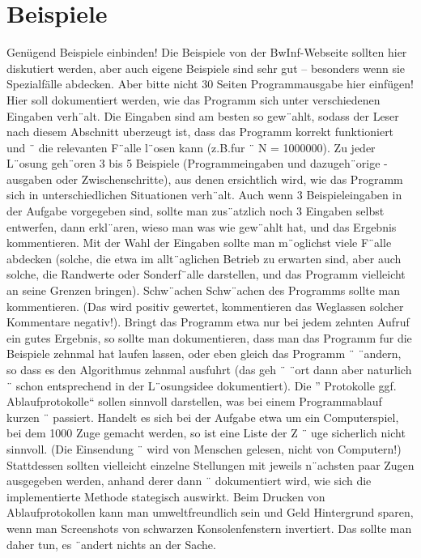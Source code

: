 \documentclass[a4paper,10pt,ngerman]{scrartcl}
\begin{document}
    \section{Beispiele}\label{sec:beispiele}
    Genügend Beispiele einbinden!
    Die Beispiele von der BwInf-Webseite sollten hier diskutiert werden,
    aber auch eigene Beispiele sind sehr gut – besonders wenn sie Spezialfälle abdecken.
    Aber bitte nicht 30 Seiten Programmausgabe hier einfügen!
    Hier soll dokumentiert werden, wie das Programm sich unter verschiedenen Eingaben verh¨alt.
    Die Eingaben sind am besten so gew¨ahlt, sodass der Leser
    nach diesem Abschnitt uberzeugt ist, dass das Programm korrekt funktioniert und ¨
    die relevanten F¨alle l¨osen kann (z.B.fur ¨ N = 1000000).
    Zu jeder L¨osung geh¨oren 3 bis 5 Beispiele (Programmeingaben und dazugeh¨orige -
    ausgaben oder Zwischenschritte), aus denen ersichtlich wird, wie das Programm sich
    in unterschiedlichen Situationen verh¨alt.
    Auch wenn 3 Beispieleingaben in der Aufgabe
    vorgegeben sind, sollte man zus¨atzlich noch 3 Eingaben selbst entwerfen, dann erkl¨aren,
    wieso man was wie gew¨ahlt hat, und das Ergebnis kommentieren.
    Mit der Wahl der Eingaben sollte man m¨oglichst viele F¨alle abdecken (solche, die etwa im allt¨aglichen Betrieb
    zu erwarten sind, aber auch solche, die Randwerte oder Sonderf¨alle darstellen, und das
    Programm vielleicht an seine Grenzen bringen).
    Schw¨achen Schw¨achen des Programms sollte man kommentieren. (Das wird positiv gewertet,
    kommentieren das Weglassen solcher Kommentare negativ!).
    Bringt das Programm etwa nur bei jedem zehnten Aufruf ein gutes Ergebnis, so sollte man dokumentieren, dass man das
    Programm fur die Beispiele zehnmal hat laufen lassen, oder eben gleich das Programm ¨
    ¨andern, so dass es den Algorithmus zehnmal ausfuhrt (das geh ¨ ¨ort dann aber naturlich ¨
    schon entsprechend in der L¨osungsidee dokumentiert).
    Die ” Protokolle ggf.
    Ablaufprotokolle“ sollen sinnvoll darstellen, was bei einem Programmablauf
    kurzen ¨ passiert.
    Handelt es sich bei der Aufgabe etwa um ein Computerspiel, bei dem 1000
    Zuge gemacht werden, so ist eine Liste der Z ¨ uge sicherlich nicht sinnvoll. (Die Einsendung ¨
    wird von Menschen gelesen, nicht von Computern!) Stattdessen sollten vielleicht einzelne
    Stellungen mit jeweils n¨achsten paar Zugen ausgegeben werden, anhand derer dann ¨
    dokumentiert wird, wie sich die implementierte Methode stategisch auswirkt.
    Beim Drucken von Ablaufprotokollen kann man umweltfreundlich sein und Geld
    Hintergrund sparen, wenn man Screenshots von schwarzen Konsolenfenstern invertiert. Das sollte
    man daher tun, es ¨andert nichts an der Sache.
\end{document}
